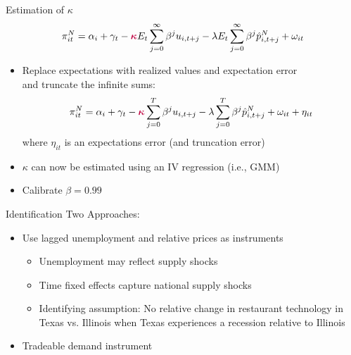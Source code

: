 \documentclass[11pt,aspectratio=169,xcolor={dvipsnames},hyperref={pdftex,pdfpagemode=UseNone,hidelinks,pdfdisplaydoctitle=true},usepdftitle=false]{beamer}
\begin{document}
\begin{frame}{Estimation of $\kappa$}
	\[\pi_{it}^N = \alpha_i + \gamma _t - \textcolor{purple}{\boldsymbol{\kappa}} E_t \sum_{j=0}^{\infty} \beta^j u_{i,t+j} - \lambda E_t \sum_{j=0}^{\infty} \beta^j \hat{p}^N_{i,t+j} + \omega_{it} \] \vspace{-10pt}
	\begin{itemize}
		\itemsep1em 
		\item Replace expectations with realized values and expectation error \\ and truncate the infinite sums:
		\[\pi_{it}^N = \alpha_i + \gamma _t - \textcolor{purple}{\boldsymbol{\kappa}} \sum_{j=0}^{T} \beta^j u_{i,t+j} - \lambda \sum_{j=0}^{T} \beta^j \hat{p}^N_{i,t+j} + \omega_{it} + \eta_{it} \]
		where $\eta_{it}$ is an expectations error (and truncation error)
		\item $\kappa$ can now be estimated using an IV regression (i.e., GMM) \vspace{5pt}
		\item Calibrate $\beta = 0.99$
	\end{itemize}
\end{frame}


\begin{frame}{Identification} \label{identification}
	Two Approaches: \vspace{10pt}
	\begin{itemize}
		\itemsep1em 
		\item Use lagged unemployment and relative prices as instruments
		\begin{itemize}
			\item Unemployment may reflect supply shocks
			\item Time fixed effects capture national supply shocks
			\item Identifying assumption: No relative change in restaurant technology in Texas vs. Illinois when Texas experiences a recession relative to Illinois
		\end{itemize}
		\item Tradeable demand instrument
	\end{itemize}
\end{frame}
\end{document}
